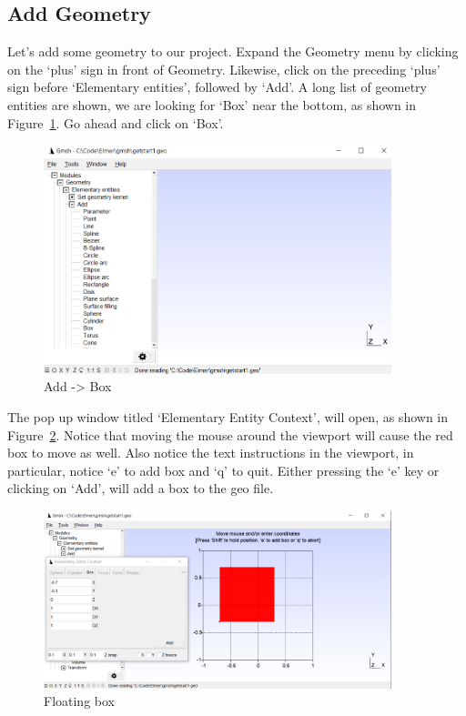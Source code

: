 \subsection{Add Geometry}

Let's add some geometry to our project.  Expand the Geometry menu by clicking on the `plus' sign in front of Geometry.   Likewise, click on the preceding `plus' sign before `Elementary entities', followed by `Add'.  A long list of geometry entities are shown, we are looking for `Box' near the bottom, as shown in Figure~\ref{fg:gmsh-08}.  Go ahead and click on `Box'.

\begin{figure}[H]
\centering
\includegraphics[width=0.9\textwidth]{gmsh-08}
\caption{Add -> Box}\label{fg:gmsh-08}
\end{figure}

The pop up window titled `Elementary Entity Context', will open, as shown in Figure~\ref{fg:gmsh-09}.  Notice that moving the mouse around the viewport will cause the red box to move as well.  Also notice the text instructions in the viewport, in particular, notice `e' to add box and `q' to quit.  Either pressing the `e' key or clicking on `Add', will add a box to the geo file.

\begin{figure}[H]
\centering
\includegraphics[width=0.9\textwidth]{gmsh-09}
\caption{Floating box}\label{fg:gmsh-09}
\end{figure}

